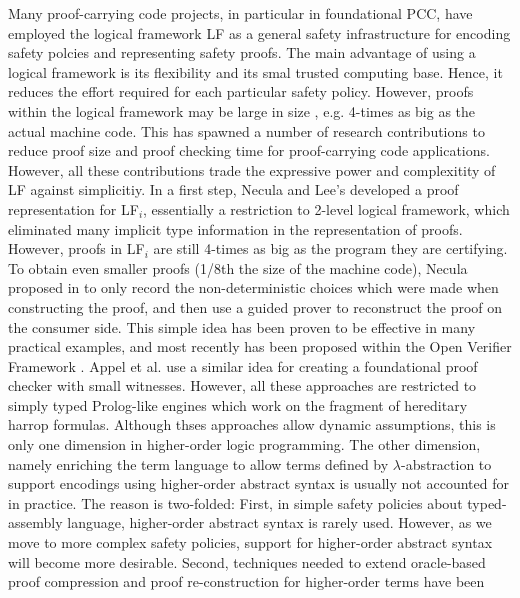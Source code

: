 \documentclass{acmconf}
\begin{document}
Many proof-carrying code projects, in particular in foundational PCC,
have employed the logical framework LF as a general safety
infrastructure for encoding safety polcies and representing safety
proofs\cite{AppelFelty00,Crary:POPL03,AppelFelten99,Crary:CADE03}.
The main advantage of using a logical framework is its flexibility
and its smal trusted computing base. Hence, it reduces the effort
required for each particular safety policy. However, proofs within the
logical framework may be large in size 
, e.g. 4-times as big as the
actual machine code. This has spawned a number of research
contributions to reduce proof size and proof checking time for
proof-carrying code applications. However, all these contributions
trade the expressive power and complexitity of LF against
simplicitiy. 
In a first step, Necula and Lee's \cite{Necula98lics} developed a
proof representation for LF$_i$, essentially a restriction to 2-level
logical framework, which eliminated many implicit type information in
the representation of proofs. However, proofs in LF$_i$ are still
4-times as big as the program they are certifying.
To obtain even smaller proofs (1/8th the size of the machine code),
Necula proposed in \cite{Necula+01:oracle} to only record the
non-deterministic choices which were made when constructing the proof,
and then use a guided prover to reconstruct the proof on the consumer
side. This simple idea has been proven to be effective in many
practical examples, and most recently has been proposed within the
Open Verifier Framework \cite{Necula}. Appel et al. use a similar idea
for creating a foundational proof checker with small
witnesses. However, all these approaches are restricted to simply 
typed Prolog-like engines which work on the fragment of hereditary
harrop formulas. Although thses approaches allow dynamic assumptions,
this is only one dimension in higher-order logic programming. The
other dimension, namely enriching the term language to allow terms
defined by $\lambda$-abstraction  to support encodings using higher-order
abstract syntax is usually not accounted for in practice. The reason
is two-folded: First, in simple safety policies about typed-assembly
language, higher-order abstract syntax is rarely used. However, as we
move to more complex safety policies, support for higher-order
abstract syntax will become more desirable. Second, techniques needed
to extend oracle-based proof compression and proof re-construction for
higher-order terms have been 
\end{document}
